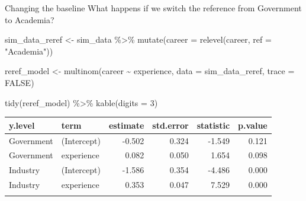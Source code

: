 \documentclass[
  ignorenonframetext,
]{beamer}
\newenvironment{Shaded}{\begin{snugshade}}{\end{snugshade}}
\newcommand{\AttributeTok}[1]{\textcolor[rgb]{0.40,0.45,0.13}{#1}}
\newcommand{\ConstantTok}[1]{\textcolor[rgb]{0.56,0.35,0.01}{#1}}
\newcommand{\DecValTok}[1]{\textcolor[rgb]{0.68,0.00,0.00}{#1}}
\newcommand{\FunctionTok}[1]{\textcolor[rgb]{0.28,0.35,0.67}{#1}}
\newcommand{\NormalTok}[1]{\textcolor[rgb]{0.00,0.23,0.31}{#1}}
\newcommand{\OtherTok}[1]{\textcolor[rgb]{0.00,0.23,0.31}{#1}}
\newcommand{\SpecialCharTok}[1]{\textcolor[rgb]{0.37,0.37,0.37}{#1}}
\newcommand{\StringTok}[1]{\textcolor[rgb]{0.13,0.47,0.30}{#1}}
\begin{document}
\begin{frame}[fragile]{Changing the baseline}
\label{changing-the-baseline}
What happens if we switch the reference from Government to Academia?

\begin{Shaded}
\begin{Highlighting}[]
\NormalTok{sim\_data\_reref }\OtherTok{\textless{}{-}}\NormalTok{ sim\_data }\SpecialCharTok{\%\textgreater{}\%}
  \FunctionTok{mutate}\NormalTok{(}\AttributeTok{career =} \FunctionTok{relevel}\NormalTok{(career, }\AttributeTok{ref =} \StringTok{"Academia"}\NormalTok{))}

\NormalTok{reref\_model }\OtherTok{\textless{}{-}} \FunctionTok{multinom}\NormalTok{(career }\SpecialCharTok{\textasciitilde{}}\NormalTok{ experience, }\AttributeTok{data =}\NormalTok{ sim\_data\_reref, }\AttributeTok{trace =} \ConstantTok{FALSE}\NormalTok{)}

\FunctionTok{tidy}\NormalTok{(reref\_model) }\SpecialCharTok{\%\textgreater{}\%} \FunctionTok{kable}\NormalTok{(}\AttributeTok{digits =} \DecValTok{3}\NormalTok{)}
\end{Highlighting}
\end{Shaded}

\begin{longtable}[]{@{}llrrrr@{}}
\toprule\noalign{}
y.level & term & estimate & std.error & statistic & p.value \\
\midrule\noalign{}
\endhead
Government & (Intercept) & -0.502 & 0.324 & -1.549 & 0.121 \\
Government & experience & 0.082 & 0.050 & 1.654 & 0.098 \\
Industry & (Intercept) & -1.586 & 0.354 & -4.486 & 0.000 \\
Industry & experience & 0.353 & 0.047 & 7.529 & 0.000 \\
\bottomrule\noalign{}
\end{longtable}


\pause


\end{frame}
\end{document}
